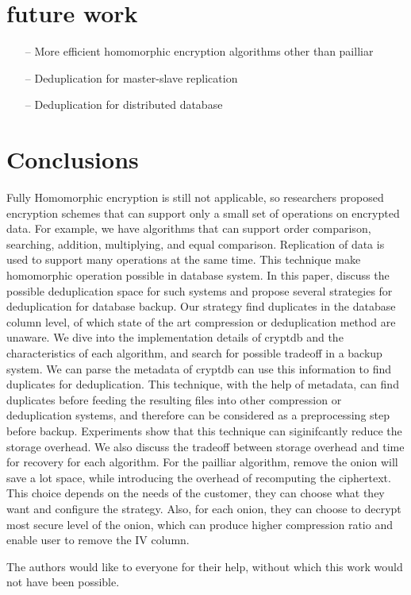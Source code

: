 \section{future work}

\begin{itemize}
\item[--] More efficient homomorphic encryption algorithms other than pailliar
\item[--] Deduplication for master-slave replication
\item[--] Deduplication for distributed database
\end{itemize}



\section{Conclusions}

Fully Homomorphic encryption is still not applicable, so researchers proposed encryption schemes that can support only a small set of operations on encrypted data. For example, we have algorithms that can support order comparison, searching, addition, multiplying, and equal comparison. Replication of data is used to support many operations at the same time. This technique make homomorphic operation possible in database system. In this paper, discuss the possible deduplication space for such systems and propose several strategies for deduplication for database backup. Our strategy find duplicates in the database column level, of which state of the art compression or deduplication method are unaware. We dive into the implementation details of cryptdb and the characteristics of each algorithm, and search for possible tradeoff in a backup system. We can parse the metadata of cryptdb can use this information to find duplicates for deduplication. This technique, with the help of metadata, can find duplicates before feeding the resulting files into other compression or deduplication systems, and therefore can be considered as a preprocessing step before backup. Experiments show that this technique can siginifcantly reduce the storage overhead. We also discuss the tradeoff between storage overhead and time for recovery for each algorithm. For the pailliar algorithm, remove the onion will save a lot space, while introducing the overhead of recomputing the ciphertext. This choice depends on the needs of the customer, they can choose what they want and configure the strategy. Also, for each onion, they can choose to decrypt most secure level of the onion, which can produce higher compression ratio and enable user to remove the IV column. 

\begin{acks}
  The authors would like to everyone for their help, without which this work would not have been possible. 
\end{acks}